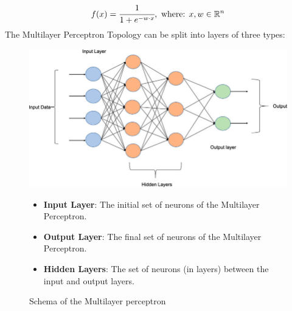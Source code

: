 \documentclass[a4paper, 11pt]{article}
\begin{document}
\begin{equation*}
f(x) = \cfrac{1}{1+e^{-w\cdot x}},\text{ where: } x,w\in\mathbb{R}^n
\end{equation*}
The Multilayer Perceptron Topology can be split into layers of three types:
\begin{figure}[h]
    \begin{minipage}{9cm}
        \includegraphics[width = 1 \textwidth]{Neural_Network/Multi-layer-perceptron-MLP-NN-basic-Architecture.png}
        \caption{Schema of the Multilayer perceptron}
    \end{minipage}
    \hspace{1em}
    \begin{minipage}{5cm}
        \begin{itemize}
            \item \textbf{Input Layer}: The initial set of neurons of the Multilayer Perceptron.
            \item \textbf{Output Layer}: The final set of neurons of the Multilayer Perceptron.
            \item \textbf{Hidden Layers}: The set of neurons (in layers) between the input and output layers.
        \end{itemize}
    \end{minipage}
\end{figure}\\
\newpage






\end{document}
